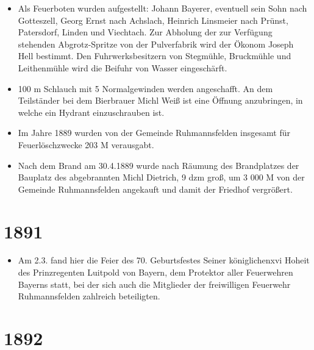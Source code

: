 \documentclass[12pt,a4paper]{book}
\begin{document}
\begin{itemize}
\item Als Feuerboten wurden aufgestellt: Johann Bayerer, eventuell sein
Sohn nach Gotteszell, Georg Ernst nach Achslach, Heinrich Linsmeier nach
Prünst, Patersdorf, Linden und Viechtach. Zur Abholung der zur Verfügung
stehenden Abgrotz-Spritze von der Pulverfabrik wird der Ökonom Joseph
Hell bestimmt. Den Fuhrwerksbesitzern von Stegmühle, Bruckmühle und
Leithenmühle wird die Beifuhr von Wasser eingeschärft.

\item 100 m Schlauch mit 5 Normalgewinden werden angeschafft. An dem
Teilständer bei dem Bierbrauer Michl Weiß ist eine Öffnung anzubringen,
in welche ein Hydrant einzuschrauben ist.

\item Im Jahre 1889 wurden von der Gemeinde Ruhmannsfelden insgesamt für
Feuerlöschzwecke 203 M verausgabt.

\item Nach dem Brand am 30.4.1889 wurde nach Räumung des Brandplatzes
der Bauplatz des abgebrannten Michl Dietrich, 9 dzm groß, um 3 000 M von
der Gemeinde Ruhmannsfelden angekauft und damit der Friedhof vergrößert.
\end{itemize}

\section*{1891}

\begin{itemize}
\item Am 2.3. fand hier die Feier des 70. Geburtsfestes Seiner
königlichenxvi Hoheit des Prinzregenten Luitpold von Bayern, dem
Protektor aller Feuerwehren Bayerns statt, bei der sich auch die
Mitglieder der freiwilligen Feuerwehr Ruhmannsfelden zahlreich
beteiligten.
\end{itemize}

\section*{1892}
\end{document}
